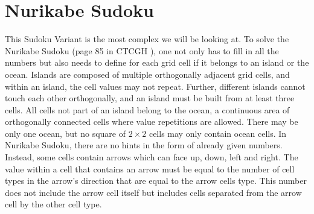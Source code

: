 \newpage
\section{Nurikabe Sudoku}
This Sudoku Variant is the most complex we will be looking at. To solve the Nurikabe Sudoku (page 85 in CTCGH \cite{CrackingTheCryptic2021}), one not only has to fill in all the numbers but also needs to define for each grid cell if it belongs to an island or the ocean. Islands are composed of multiple orthogonally adjacent grid cells, and within an island, the cell values may not repeat. Further, different islands cannot touch each other orthogonally, and an island must be built from at least three cells. All cells not part of an island belong to the ocean, a continuous area of orthogonally connected cells where value repetitions are allowed. There may be only one ocean, but no square of $2\times 2$ cells may only contain ocean cells. In Nurikabe Sudoku, there are no hints in the form of already given numbers. Instead, some cells contain arrows which can face up, down, left and right. The value within a cell that contains an arrow must be equal to the number of cell types in the arrow's direction that are equal to the arrow cells type. This number does not include the arrow cell itself but includes cells separated from the arrow cell by the other cell type.
